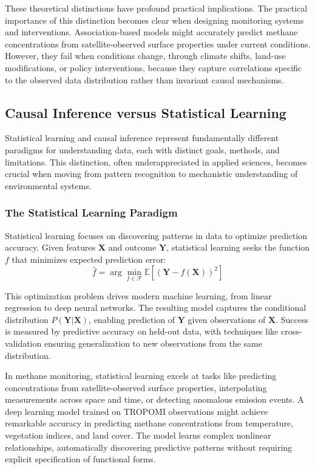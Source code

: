 These theoretical distinctions have profound practical implications. The practical importance of this distinction becomes clear when designing monitoring systems and interventions. Association-based models might accurately predict methane concentrations from satellite-observed surface properties under current conditions. However, they fail when conditions change, through climate shifts, land-use modifications, or policy interventions, because they capture correlations specific to the observed data distribution rather than invariant causal mechanisms.

\subsection{Causal Inference versus Statistical Learning}

Statistical learning and causal inference represent fundamentally different paradigms for understanding data, each with distinct goals, methods, and limitations. This distinction, often underappreciated in applied sciences, becomes crucial when moving from pattern recognition to mechanistic understanding of environmental systems.

\subsubsection{The Statistical Learning Paradigm}

Statistical learning focuses on discovering patterns in data to optimize prediction accuracy. Given features $\mathbf{X}$ and outcome $\mathbf{Y}$, statistical learning seeks the function $f$ that minimizes expected prediction error:
\begin{equation}
	\hat{f} = \arg\min_{f \in \mathcal{F}} \mathbb{E}[(\mathbf{Y} - f(\mathbf{X}))^2]
\end{equation}

This optimization problem drives modern machine learning, from linear regression to deep neural networks. The resulting model captures the conditional distribution $P(\mathbf{Y}|\mathbf{X})$, enabling prediction of $\mathbf{Y}$ given observations of $\mathbf{X}$. Success is measured by predictive accuracy on held-out data, with techniques like cross-validation ensuring generalization to new observations from the same distribution.

In methane monitoring, statistical learning excels at tasks like predicting concentrations from satellite-observed surface properties, interpolating measurements across space and time, or detecting anomalous emission events. A deep learning model trained on TROPOMI observations might achieve remarkable accuracy in predicting methane concentrations from temperature, vegetation indices, and land cover. The model learns complex nonlinear relationships, automatically discovering predictive patterns without requiring explicit specification of functional forms.

